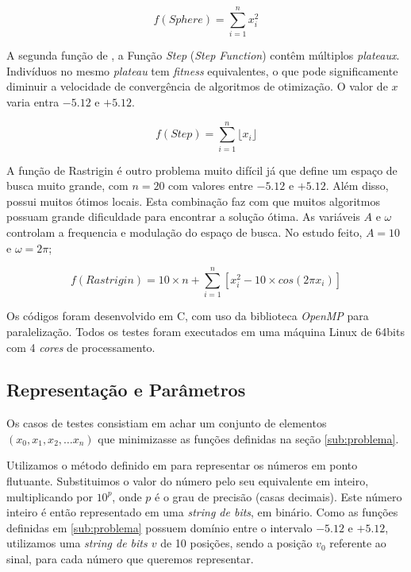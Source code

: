 \documentclass[12pt]{article}
\begin{document}
\begin{equation} \label{eq:spher}
  f(Sphere) = \sum_{i = 1}^{n} x_{i}^2
\end{equation}

A segunda função de \cite{dejong1975}, a Função \emph{Step} (\emph{Step Function}) contêm múltiplos \emph{plateaux}. Indivíduos no mesmo \emph{plateau} tem \emph{fitness} equivalentes, o que pode significamente diminuir a velocidade de convergência de algoritmos de otimização. O valor de $x$ varia entra $-5.12$ e $+5.12$.

\begin{equation} \label{eq:step}
  f(Step) = \sum_{i = 1}^{n} \lfloor x_{i} \rfloor
\end{equation}

A função de Rastrigin é outro problema muito difícil já que define um espaço de busca muito grande, com $n = 20$ com valores entre $-5.12$ e $+5.12$. Além disso, possui muitos ótimos locais. Esta combinação faz com que muitos algoritmos possuam grande dificuldade para encontrar a solução ótima. As variáveis $A$ e $\omega$ controlam a frequencia e modulação do espaço de busca. No estudo feito, $A = 10$ e $\omega = 2\pi$;

\begin{equation} \label{eq:rast}
  f(Rastrigin) = 10 \times n + \sum_{i=1}^{n} \left[ x_{i}^2 - 10 \times cos(2 \pi x_i)\right]
\end{equation}



Os códigos foram desenvolvido em C, com uso da biblioteca \emph{OpenMP} para paralelização. Todos os testes foram executados em uma máquina Linux de 64bits com 4 \emph{cores} de processamento.


\subsection{Representação e Parâmetros} %
\label{sub:representacao}

Os casos de testes consistiam em achar um conjunto de elementos $(x_0, x_1, x_2, \dots x_n)$ que minimizasse as funções definidas na seção \ref{sub:problema}.

Utilizamos o método definido em \cite[p. 3]{gasurvey} para representar os números em ponto flutuante. Substituimos o valor do número pelo seu equivalente em inteiro, multiplicando por $10^p$, onde $p$ é o grau de precisão (casas decimais). Este número inteiro é então representado em uma \emph{string de bits}, em binário. Como as funções definidas em \ref{sub:problema} possuem domínio entre o intervalo $-5.12$ e $+5.12$, utilizamos uma \emph{string de bits $v$} de 10 posições, sendo a posição $v_0$ referente ao sinal, para cada número que queremos representar.
\end{document}
